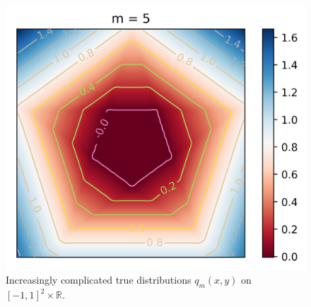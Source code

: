 \documentclass{article} %
\begin{document}
\begin{figure}[h]
\begin{center}
\includegraphics[scale=0.4]{truedist5.png}
\end{center}
\caption{Increasingly complicated true distributions $q_m(x,y)$ on $[-1,1]^2 \times \mathbb{R}$.}
\label{fig:simp_func_complex}
\end{figure}
\end{document}
